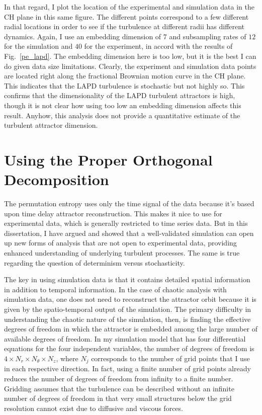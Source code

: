 In that regard, I plot the location of the experimental and simulation data in the CH plane in this same figure. The different points correspond to a few different radial locations in order
to see if the turbulence at different radii has different dynamics. Again, I use an embedding dimension of $7$ and subsampling rates of $12$ for the simulation and $40$ for the experiment,
in accord with the results of Fig.~\ref{pe_lapd}. The embedding dimension here is too low, but it is the best I can do given data size limitations. Clearly, the experiment and simulation
data points are located right along the fractional Brownian motion curve in the CH plane. This indicates that the LAPD turbulence is stochastic but not highly so. This confirms that the dimensionality
of the LAPD turbulent attractors is high, though it is not clear how using too low an embedding dimension affects this result. Anyhow, this analysis does not provide a quantitative estimate
of the turbulent attractor dimension.

\section{Using the Proper Orthogonal Decomposition}
\label{s_pod_chaos}

The permutation entropy uses only the time signal of the data because it's based upon time delay attractor reconstruction. This makes it nice to use for experimental data, which is generally
restricted to time series data. But in this dissertation, I have argued and showed that a well-validated simulation can open up new forms of analysis that are not open to experimental data,
providing enhanced understanding of underlying turbulent processes. The same is true regarding the question of determinism versus stochasticity.

The key in using simulation data is that it contains detailed spatial information in addition to temporal information. In the case of chaotic analysis with simulation data, 
one does not need to reconstruct the attractor orbit because it is given by the spatio-temporal output of the simulation. The primary difficulty in understanding the chaotic nature of the simulation, 
then, is finding the effective degrees of freedom in which the attractor is embedded among the large number of available degrees of freedom. In my simulation model that has four differential
equations for the four independent variables, the number of degrees of freedom is $4 \times N_r \times N_\theta \times N_z$, where $N_j$ corresponds to the number of grid points that I use in each
respective direction. In fact, using a finite number of grid points already reduces the number of degrees of freedom from infinity to a finite number. Gridding assumes that the turbulence
can be described without an infinite number of degrees of freedom in that very small structures below the grid resolution cannot exist due to diffusive and viscous forces. 

